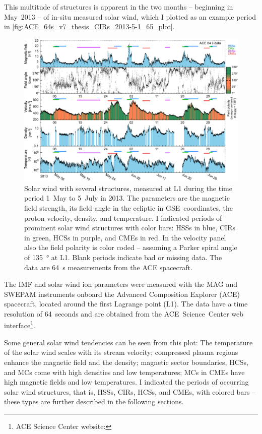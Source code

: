 This multitude of structures is apparent in the two months -- beginning in May~2013 -- of in-situ measured solar wind, which I plotted as an example period in \autoref{fig:ACE_64s_v7_thesis_CIRs_2013-5-1_65_plot}.
\begin{figure}[htb]
	\centering
	\includegraphics[width=\textwidth]{figures_of_mine/gnuplots/ACE_64s_v7_thesis_CIRs_2013-5-1_65_plot.pdf}
	\caption{Solar wind with several structures, measured at L1 during the time period 1~May to 5~July in 2013. The parameters are the magnetic field strength, its field angle in the ecliptic in GSE~coordinates, the proton velocity, density, and temperature. I indicated periods of prominent solar wind structures with color bars: HSSs in blue, CIRs in green, HCSs in purple, and CMEs in red. In the velocity panel also the field polarity is color coded -- assuming a Parker spiral angle of \SI{135}{\degree} at L1. Blank periods indicate bad or missing data. The data are 64~s measurements from the ACE spacecraft.}
	\label{fig:ACE_64s_v7_thesis_CIRs_2013-5-1_65_plot}
\end{figure}
The IMF and solar wind ion parameters were measured with the MAG and SWEPAM instruments onboard the Advanced Composition Explorer (ACE) spacecraft, located around the first Lagrange point (L1). The data have a time resolution of 64~seconds and are obtained from the ACE~Science~Center web interface\footnote{ACE Science Center website: }.

Some general solar wind tendencies can be seen from this plot: The temperature of the solar wind scales with its stream velocity; compressed plasma regions enhance the magnetic field and the density; magnetic sector boundaries, HCSs, and MCs come with high densities and low temperatures; MCs in CMEs have high magnetic fields and low temperatures. I indicated the periods of occurring solar wind structures, that is, HSSs, CIRs, HCSs, and CMEs, with colored bars -- these types are further described in the following sections.

